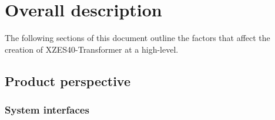 \section{Overall description}


The following sections of this document outline the factors that affect the creation of XZES40-Transformer at a high-level.

\subsection{Product perspective}

\subsubsection{System interfaces}


